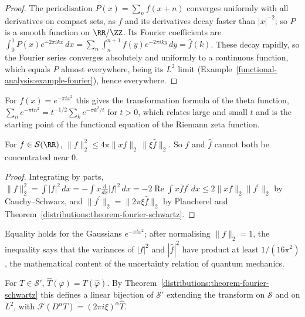 \begin{proof}
The periodisation $P(x) = \sum_nf(x + n)$ converges uniformly with all derivatives on compact sets, as $f$ and its derivatives decay faster than $|x|^{-2}$; so $P$ is a smooth function on $\RR/\ZZ$. Its
Fourier coefficients are $\int_0^1P(x)e^{-2\pi ikx}\,dx = \sum_n\int_n^{n+1}f(y)e^{-2\pi iky}\,dy = \hat f(k)$. These decay rapidly, so the Fourier series converges absolutely and uniformly to a continuous
function, which equals $P$ almost everywhere, being its $L^2$ limit (Example~\ref{functional-analysis:example-fourier}), hence everywhere.
\end{proof}

For $f(x) = e^{-\pi tx^2}$ this gives the transformation formula of the theta function, $\sum_ne^{-\pi tn^2} = t^{-1/2}\sum_ke^{-\pi k^2/t}$ for $t > 0$, which relates large and small $t$ and is
the starting point of the functional equation of the Riemann zeta function.

\begin{proposition}\label{distributions:proposition-heisenberg}
For $f \in \mathcal{S}(\RR)$, $\|f\|_2^2 \leq 4\pi\|xf\|_2\,\|\xi\hat f\|_2$. So $f$ and $\hat f$ cannot both be concentrated near $0$.
\end{proposition}

\begin{proof}
Integrating by parts, $\|f\|_2^2 = \int|f|^2\,dx = -\int x\frac{d}{dx}|f|^2\,dx = -2\operatorname{Re}\int x\bar ff^{\prime}\,dx \leq 2\|xf\|_2\|f^{\prime}\|_2$ by Cauchy--Schwarz, and
$\|f^{\prime}\|_2 = \|2\pi\xi\hat f\|_2$ by Plancherel and Theorem~\ref{distributions:theorem-fourier-schwartz}.
\end{proof}

Equality holds for the Gaussians $e^{-\pi tx^2}$; after normalising $\|f\|_2 = 1$, the inequality says that the variances of $|f|^2$ and $|\hat f|^2$ have product at least $1/(16\pi^2)$, the mathematical
content of the uncertainty relation of quantum mechanics.

\begin{definition}\label{distributions:definition-fourier-tempered}
For $T \in \mathcal{S}'$, $\hat T(\varphi) = T(\hat\varphi)$. By Theorem~\ref{distributions:theorem-fourier-schwartz} this defines a linear bijection of $\mathcal{S}'$ extending the transform on $\mathcal{S}$
and on $L^2$, with $\mathcal{F}(D^\alpha T) = (2\pi i\xi)^\alpha\hat T$.
\end{definition}

